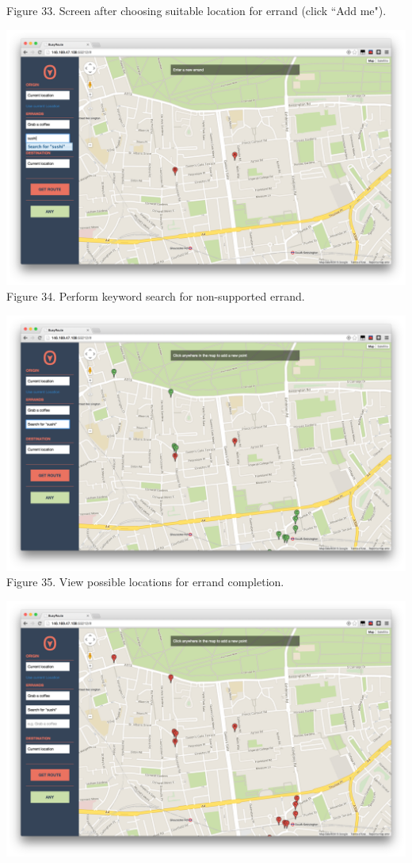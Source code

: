 \documentclass[a4paper, 10pt]{report}
\begin{document}
\begin{appendices}
\begin{center}
Figure 33. Screen after choosing suitable location for errand (click ``Add me").
\end{center}
\begin{center}
\includegraphics[scale=0.18]{um-07-keyword-search.png}\\
Figure 34. Perform keyword search for non-supported errand.
\end{center}
\begin{center}
\includegraphics[scale=0.18]{um-08-keyword-results.png}\\
Figure 35. View possible locations for errand completion.
\end{center}
\begin{center}
\includegraphics[scale=0.18]{um-09-keyword-any.png}\\

\end{center}
\end{appendices}
\end{document}
